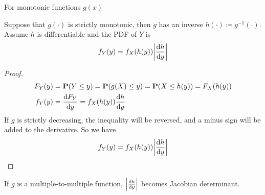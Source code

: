 For monotonic functions $g(x)$
\begin{theorem}
    Suppose that $g(\cdot)$ is strictly monotonic, then $g$ has an inverse $h(\cdot) \coloneqq g^{-1}(\cdot)$. Assume $h$ is differentiable and the PDF of $Y$ is
    \begin{equation}
        f_{Y}(y) = f_{X}(h(y)) \abs{\dv{h}{y}}
    \end{equation}
\end{theorem}
\begin{proof}
    \begin{align}
        F_{Y}(y) &= \mathbf{P}(Y \leq y) = \mathbf{P}(g(X) \leq y) = \mathbf{P}(X \leq h(y)) = F_{X}(h(y)) \\ 
        f_{Y}(y) &= \dv{F_{Y}}{y} = f_{X}(h(y)) \dv{h}{y}
    \end{align}
    If $g$ is strictly decreasing, the inequality will be reversed, and a minus sign will be added to the derivative. So we have
    \begin{equation}
        f_{Y}(y) = f_{X}(h(y)) \abs{\dv{h}{y}}
    \end{equation}
\end{proof}
\begin{remark}
    If $g$ is a multiple-to-multiple function, $\abs{\dv{h}{y}}$ becomes Jacobian determinant.
\end{remark}

